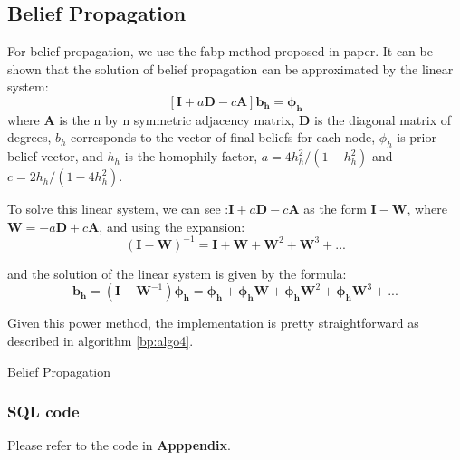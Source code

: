 \subsection{Belief Propagation}
For belief propagation, we use the fabp method proposed in paper\cite{DBLP:conf/pkdd/KoutraKKCPF11}.
It can be shown that the solution of belief propagation can be approximated by the linear system:$$[\mathbf{I}	 + a\mathbf{D} - c\mathbf{A}]\mathbf{b_h} = \mathbf{\phi_h}$$ 
where $\mathbf{A}$ is the n by n symmetric adjacency matrix, $\mathbf{D}$ is the diagonal matrix of degrees, $b_h$ corresponds to the vector of final beliefs for each node, $\phi_h$ is prior belief vector, and $h_h$ is the homophily factor,  $a = 4h_h^2/(1 - h_h^2)$ and $c = 2h_h / (1-4h_h^2)$.

To solve this linear system, we can see :$\mathbf{I} + a\mathbf{D} - c\mathbf{A}$ as the form $\mathbf{I} - \mathbf{W}$, where $\mathbf{W} = -a\mathbf{D} + c\mathbf{A}$, and using the expansion:$$(\mathbf{I} - \mathbf{W})^{-1} = \mathbf{I} + \mathbf{W} + \mathbf{W}^2 + \mathbf{W}^3 + ...$$

and the solution of the linear system is given by the formula:
$$\mathbf{b_h} = (\mathbf{I} - \mathbf{W}^{-1})\mathbf{\phi_h} =\mathbf{\phi_h}  + \mathbf{\phi_h} \mathbf{W} + \mathbf{\phi_h} \mathbf{W}^2 + \mathbf{\phi_h} \mathbf{W}^3 + ...$$

Given this power method, the implementation is pretty straightforward as described in algorithm \ref{bp:algo4}.
\begin{algorithm}
\caption{Belief Propagation}
\begin{algorithmic}
\REPEAT
{}
\end{algorithmic}
\label{bp:algo4}
\end{algorithm}

\subsubsection{SQL code}
Please refer to the code in {\bf Apppendix}.

